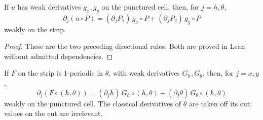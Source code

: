 \begin{lemma}
\label{lem:action-angle-weak}
\leanok
If $u$ has weak derivatives $g_x,g_y$ on the punctured cell, then, for
$j=h,\theta$,
\[
  \partial_j(u\circ P)=(\partial_jP_1)\,g_x\circ P
    +(\partial_jP_2)\,g_y\circ P
\]
weakly on the strip.
\end{lemma}

\begin{proof}
\leanok
These are the two preceding directional rules. Both are proved in Lean
without admitted dependencies.
\end{proof}

\begin{lemma}
\label{lem:action-angle-weak-cell}
\leanok
If $F$ on the strip is $1$-periodic in $\theta$, with weak derivatives
$G_h,G_\theta$, then, for $j=x,y$,
\[
  \partial_j(F\circ(h,\theta))
    =(\partial_jh)\,G_h\circ(h,\theta)
      +(\partial_j\theta)\,G_\theta\circ(h,\theta)
\]
weakly on the punctured cell. The classical derivatives of $\theta$
are taken off its cut; values on the cut are irrelevant.
\end{lemma}


